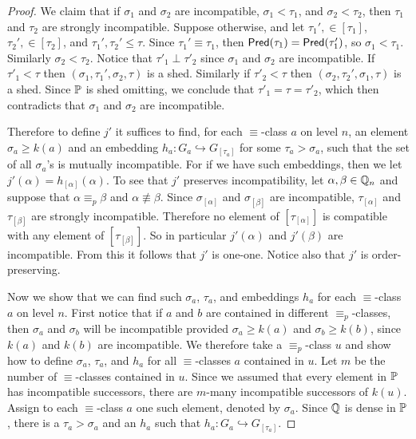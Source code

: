 \begin{proof}
We claim that if $\sigma_1$ and $\sigma_2$
are incompatible, $\sigma_1<\tau_1$, and
$\sigma_2<\tau_2$, then $\tau_1$ and $\tau_2$
are strongly incompatible.
Suppose otherwise, and let $\tau_1',\in[\tau_1]$,
$\tau_2',\in[\tau_2]$, and $\tau_1',\tau_2'\leq\tau$.
Since $\tau_1'\equiv\tau_1$, then $\mathsf{Pred}(\tau_1)=\mathsf{Pred}(\tau_1')$,
so $\sigma_1<\tau_1$.  Similarly $\sigma_2<\tau_2$.
Notice that $\tau'_1\perp\tau'_2$ since
$\sigma_1$ and $\sigma_2$ are incompatible.
If $\tau'_1<\tau$ then $(\sigma_1,\tau_1',\sigma_2,\tau)$
is a shed.
Similarly if $\tau'_2<\tau$ then
$(\sigma_2,\tau_2',\sigma_1,\tau)$ is a shed.
Since $\mathbb{P}$ is shed omitting,
we conclude that $\tau'_1=\tau=\tau'_2$,
which then contradicts that $\sigma_1$
and $\sigma_2$ are incompatible.

Therefore to define $j'$ it suffices to find,
for each $\equiv$-class $a$ on level $n$,
an element $\sigma_a\geq k(a)$ and
an embedding $h_{a}:G_a\hookrightarrow G_{[\tau_a]}$
for some $\tau_a>\sigma_a$,
such that the set of all $\sigma_a$'s is mutually incompatible.
For if we have such embeddings, then we
let $j'(\alpha)=h_{[\alpha]}(\alpha)$.
To see that $j'$ preserves
incompatibility, let $\alpha,\beta\in\mathbb{Q}_n$ and
suppose that $\alpha\equiv_p\beta$
and $\alpha\not\equiv\beta$.
Since $\sigma_{[\alpha]}$ and $\sigma_{[\beta]}$
are incompatible, $\tau_{[\alpha]}$ and $\tau_{[\beta]}$
are strongly incompatible.
Therefore no element of $[\tau_{[\alpha]}]$ is compatible
with any element of $[\tau_{[\beta]}]$.
So in particular $j'(\alpha)$ and $j'(\beta)$
are incompatible.
From this it follows that $j'$ is one-one.
Notice also that $j'$ is order-preserving.

Now we show that we can find such $\sigma_a$, $\tau_a$,
and embeddings $h_{a}$ for each $\equiv$-class $a$ on level $n$.
First notice that if $a$ and $b$ are contained
in different $\equiv_p$-classes, then
$\sigma_a$ and $\sigma_b$ will be incompatible
provided $\sigma_a\geq k(a)$ and $\sigma_b\geq k(b)$,
since $k(a)$ and $k(b)$ are incompatible.
We therefore take a $\equiv_p$-class $u$
and show how to define $\sigma_a$, $\tau_a$,
and $h_a$ for all $\equiv$-classes $a$ contained in $u$.
Let $m$ be the number of $\equiv$-classes contained in $u$.
Since we assumed that every element in $\mathbb{P}$ has
incompatible successors, there are $m$-many
incompatible successors of $k(u)$.
Assign to each $\equiv$-class $a$ one such element, denoted by $\sigma_a$.
Since $\mathbb{Q}$ is dense in $\mathbb{P}$, there is a $\tau_a> \sigma_a$ and an $h_a$
such that $h_a:G_{a}\hookrightarrow G_{[\tau_a]}$.


\end{proof}
